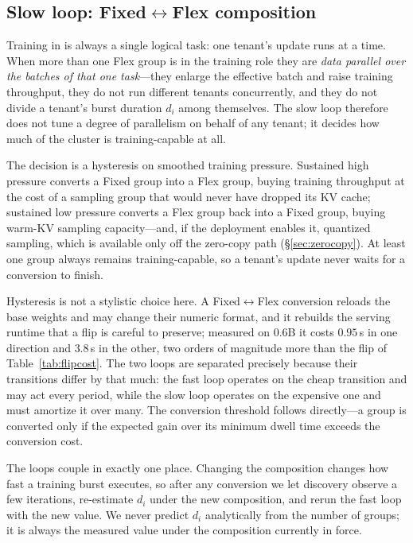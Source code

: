 
\subsection{Slow loop: Fixed$\leftrightarrow$Flex composition}
\label{sec:sched:slow}
Training in \sysname is always a single logical task: one tenant's update runs at a
time. When more than one Flex group is in the training role they are \emph{data
parallel over the batches of that one task}---they enlarge the effective batch and raise
training throughput, they do not run different tenants concurrently, and they do not
divide a tenant's burst duration $d_i$ among themselves. The slow loop therefore does
not tune a degree of parallelism on behalf of any tenant; it decides how much of the
cluster is training-capable at all.

The decision is a hysteresis on smoothed training pressure. Sustained high pressure
converts a Fixed group into a Flex group, buying training throughput at the cost of a
sampling group that would never have dropped its KV cache; sustained low pressure
converts a Flex group back into a Fixed group, buying warm-KV sampling capacity---and,
if the deployment enables it, quantized sampling, which is available only off the
zero-copy path (\S\ref{sec:zerocopy}). At least one group always remains
training-capable, so a tenant's \textsf{update} never waits for a conversion to finish.

Hysteresis is not a stylistic choice here. A Fixed$\leftrightarrow$Flex conversion
reloads the base weights and may change their numeric format, and it rebuilds the
serving runtime that a flip is careful to preserve; measured on 0.6B it costs $0.95$\,s
in one direction and $3.8$\,s in the other, two orders of magnitude more than the flip
of Table~\ref{tab:flipcost}. The two loops are separated precisely because their
transitions differ by that much: the fast loop operates on the cheap transition and may
act every period, while the slow loop operates on the expensive one and must amortize it
over many. The conversion threshold follows directly---a group is converted only if the
expected gain over its minimum dwell time exceeds the conversion cost.

The loops couple in exactly one place. Changing the composition changes how fast a
training burst executes, so after any conversion we let discovery observe a few
iterations, re-estimate $d_i$ under the new composition, and rerun the fast loop with the
new value. We never predict $d_i$ analytically from the number of groups; it is always
the measured value under the composition currently in force.

